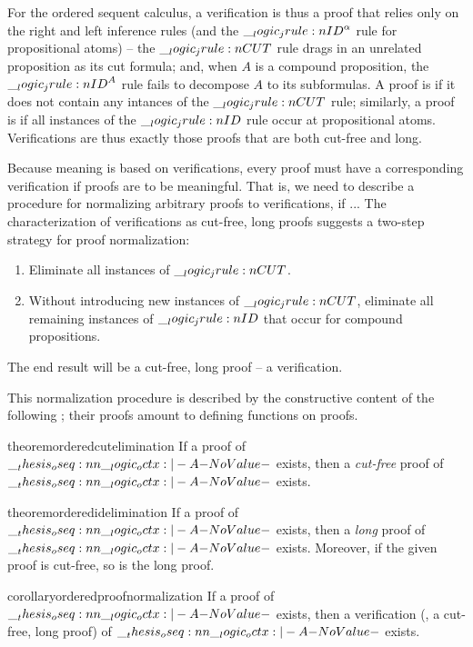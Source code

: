For the ordered sequent calculus, a verification is thus a proof that relies only on the right and left inference rules (and the $\__logic_jrule:n {ID}^{\alpha}$ rule for propositional atoms) -- the $\__logic_jrule:n {CUT}$ rule drags in an unrelated proposition as its cut formula; and, when $A$ is a compound proposition, the $\__logic_jrule:n {ID}^A$ rule fails to decompose $A$ to its subformulas.
A proof is  if it does not contain any intances of the $\__logic_jrule:n {CUT}$ rule; similarly, a proof is  if all instances of the $\__logic_jrule:n {ID}$ rule occur at propositional atoms.
Verifications are thus exactly those proofs that are both cut-free and long.

Because meaning is based on verifications, every proof must have a corresponding verification if proofs are to be meaningful.
That is, we need to describe a procedure for normalizing arbitrary proofs to verifications, if ...
The characterization of verifications as cut-free, long proofs suggests a two-step strategy for proof normalization:
\begin{enumerate}[topsep=.33\baselineskip, noitemsep]
  \label{list:ordered-logic:normalization}
\item Eliminate all instances of $\__logic_jrule:n {CUT}$.
\item Without introducing new instances of $\__logic_jrule:n {CUT}$, eliminate all remaining instances of $\__logic_jrule:n {ID}$ that occur for compound propositions.
\end{enumerate}
The end result will be a cut-free, long proof -- a verification.

This normalization procedure is described by the constructive content of the following ; their proofs amount to defining functions on proofs.%
%
\begin{restatable*}[
      name=Cut elimination,
      label=thm:ordered-logic:cut-elimination
    ]{theorem}{orderedcutelimination}
      If a proof of\/ $\oseq{\octx |- A}$ exists, then a \emph{cut-free} proof of\/ $\oseq{\octx |- A}$ exists.
    \end{restatable*}
%
\begin{restatable*}[
      name=Identity elimination,
      label=thm:ordered-logic:identity-elimination
    ]{theorem}{orderedidelimination}
      If a proof of\/ $\oseq{\octx |- A}$ exists, then a \emph{long} proof of\/ $\oseq{\octx |- A}$ exists.
      Moreover, if the given proof is cut-free, so is the long proof.
    \end{restatable*}
%
\begin{restatable*}[
  name=Proof normalization,
  label=cor:ordered-logic:proof-normalization
]{corollary}{orderedproofnormalization}
  If a proof of\/ $\oseq{\octx |- A}$ exists, then a verification (\ie, a cut-free, long proof) of\/ $\oseq{\octx |- A}$ exists.
\end{restatable*}


